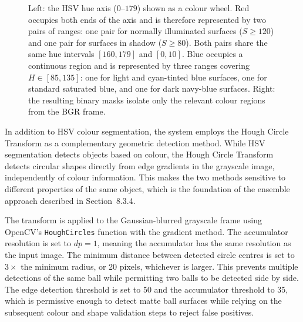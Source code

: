 \begin{figure}[h]
\begin{tikzpicture}[scale=0.85]
\end{tikzpicture}
\caption[HSV hue axis and resulting binary masks for red and blue detection.]{Left: the HSV hue axis ($0$--$179$) shown as a colour wheel. Red occupies
both ends of the axis and is therefore represented by two pairs of ranges: one pair
for normally illuminated surfaces ($S \geq 120$) and one pair for surfaces in shadow
($S \geq 80$). Both pairs share the same hue intervals $[160, 179]$ and $[0, 10]$.
Blue occupies a continuous region and is represented by three ranges covering
$H \in [85, 135]$: one for light and cyan-tinted blue surfaces, one for standard
saturated blue, and one for dark navy-blue surfaces.
Right: the resulting binary masks isolate only the relevant colour regions from the
BGR frame.}
\label{fig:hsv_mask}
\end{figure}


In addition to HSV colour segmentation, the system employs the Hough Circle
Transform as a complementary geometric detection method. While HSV segmentation
detects objects based on colour, the Hough Circle Transform detects circular shapes
directly from edge gradients in the grayscale image, independently of colour
information. This makes the two methods sensitive to different properties of the
same object, which is the foundation of the ensemble approach described in
Section~8.3.4.

The transform is applied to the Gaussian-blurred grayscale frame using
OpenCV's \texttt{HoughCircles} function with the gradient method. The accumulator
resolution is set to $dp = 1$, meaning the accumulator has the same resolution as
the input image. The minimum distance between detected circle centres is set to
$3\times$ the minimum radius, or 20 pixels, whichever is larger. This prevents
multiple detections of the same ball while permitting two balls to be detected side
by side. The edge detection threshold is set to 50 and the accumulator threshold to
35, which is permissive enough to detect matte ball surfaces while relying on the
subsequent colour and shape validation steps to reject false positives.

